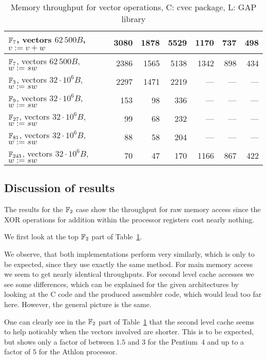 \begin{table}[ht]
\begin{center}
\begin{tabular}{|l|r|r|r|r|r|r|}
\hline
$\mathbb{F}_7$, vectors $62\,500 B$, $v := v+w$      
& 3080 & 1878 & 5529 & 1170 & 737 & 498 \\
\hline                                                    
$\mathbb{F}_7$, vectors $62\,500 B$, $w := sw$       
& 2386 & 1565 & 5138 & 1342 & 898 & 434 \\
\hline
\hline
$\mathbb{F}_3$, vectors $32\cdot 10^6 B$, $w := sw$
& 2297 & 1471 & 2219 & --- & --- & --- \\
\hline
$\mathbb{F}_9$, vectors $32\cdot 10^6 B$, $w := sw$
& 153 & 98 & 336 & --- & --- & --- \\
\hline
$\mathbb{F}_{27}$, vectors $32\cdot 10^6 B$, $w := sw$
& 99 & 68 & 232 & --- & --- & --- \\
\hline
$\mathbb{F}_{81}$, vectors $32\cdot 10^6 B$, $w := sw$
& 88 & 58 & 204 & --- & --- & --- \\
\hline
$\mathbb{F}_{243}$, vectors $32\cdot 10^6 B$, $w := sw$
& 70 & 47 & 170 & 1166 & 867 & 422 \\
\hline
\end{tabular}
\end{center}
\caption{Memory throughput for vector operations, C: {\sf cvec} package, 
L: {\sf GAP} library}
\label{memthrough}
\end{table}

\subsection{Discussion of results}
\label{ssec:discussion}

The results for the $\mathbb{F}_2$ case show the throughput for raw memory access
since the XOR operations for addition within the processor registers cost
nearly nothing. 

We first look at the top $\mathbb{F}_2$ part of Table~\ref{memthrough}.

We observe, that both implementations perform very similarly, which is
only to be expected, since they use exactly the same method. For
main memory access we seem to get nearly identical throughputs. For 
second level cache accesses we see some differences, which can be
explained for the given architectures by looking at the C code and the
produced assembler code, which would lead too far here. However, 
the general picture is the same.

One can clearly see in the $\mathbb{F}_2$ part of
Table~\ref{memthrough} that the second level cache seems to help noticably
when the vectors involved are shorter. This is to be expected, but shows
only a factor of between $1.5$ and $3$ for the Pentium~4 and up to 
a factor of $5$ for the Athlon processor.

